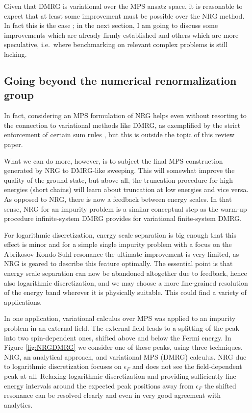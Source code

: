 Given that DMRG is variational over the MPS ansatz space, it is reasonable to expect that at least some improvement must be possible over the NRG method. In fact this is the case \cite{Weichselbaum09}; in the next section, I am going to discuss some improvements which are already firmly established and others which are more speculative, i.e.\ where benchmarking on relevant complex problems is still lacking. 

\subsection{Going beyond the numerical renormalization group}
In fact, considering an MPS formulation of NRG helps even without resorting to the connection to variational methods like DMRG, as exemplified by the strict enforcement of certain sum rules \cite{Weichselbaum07,Peters06}, but this is outside the topic of this review paper. 

What we can do more, however, is to subject the final MPS construction generated by NRG to DMRG-like sweeping. This will somewhat improve the quality of the ground state, but above all, the truncation procedure for high energies (short chains) will learn about truncation at low energies and vice versa. As opposed to NRG, there is now a feedback between energy scales. In that sense, NRG for an impurity problem is a similar conceptual step as the warm-up procedure infinite-system DMRG provides for variational finite-system DMRG. 

For logarithmic discretization, energy scale separation is big enough that this effect is minor and for a simple single impurity problem with a focus on the Abrikosov-Kondo-Suhl resonance the ultimate improvement is very limited, as NRG is geared to describe this feature optimally. The essential point is that energy scale separation can now be abandoned altogether due to feedback, hence also logarithmic discretization, and we may choose a more fine-grained resolution of the energy band wherever it is physically suitable. This could find a variety of applications.

In one application, variational calculus over MPS was applied to an impurity problem in an external field. The external field leads to a splitting of the peak into two spin-dependent ones, shifted above and below the Fermi energy. In Figure \ref{fig:NRGDMRG} we consider one of these peaks, using three techniques, NRG, an analytical approach\cite{Rosch03,Garst05}, and variational MPS (DMRG) calculus. NRG due to logarithmic discretization focuses on $\epsilon_F$ and does not see the field-dependent peak at all. Relaxing logarithmic discretization and providing sufficiently fine energy intervals around the expected peak positions away from $\epsilon_F$ the shifted resonance can be resolved clearly and even in very good agreement with analytics.

